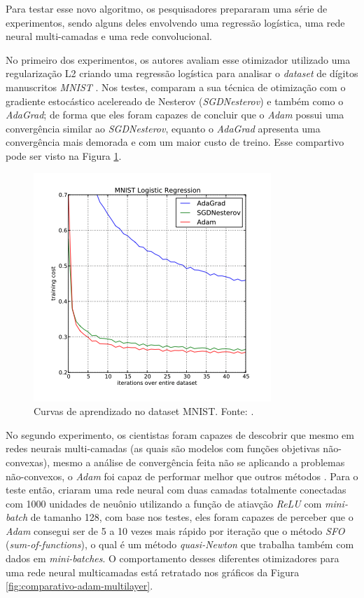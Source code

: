 Para testar esse novo algoritmo, os pesquisadores \textcite{AdamMethod} prepararam uma série de experimentos, sendo alguns deles envolvendo uma regressão logística, uma rede neural multi-camadas e uma rede convolucional.

No primeiro dos experimentos, os autores avaliam esse otimizador utilizado uma regularização L2 criando uma regressão logística para analisar o \textit{dataset} de dígitos manuscritos \textit{MNIST} \parencite{AdamMethod}. Nos testes, \textcite{AdamMethod} comparam a sua técnica de otimização com o gradiente estocástico acelereado de Nesterov (\textit{SGDNesterov}) e também como o \textit{AdaGrad}; de forma que eles foram capazes de concluir que o \textit{Adam} possui uma convergência similar ao \textit{SGDNesterov}, equanto o \textit{AdaGrad} apresenta uma convergência mais demorada e com um maior custo de treino. Esse compartivo pode ser visto na Figura \ref{fig:comparativo-adam-mnist}.

\begin{figure}[h]
    \centering
    \includegraphics[width=0.65\linewidth]{../imagens/retropropagacao-gradiente/comparativo-adam-mnist.png}
    
    \caption[Curvas de aprendizado no dataset MNIST]{%
        Curvas de aprendizado no dataset MNIST.
        \newline
        \small Fonte: \parencite{AdamMethod}.
    }
    \label{fig:comparativo-adam-mnist}
\end{figure}

No segundo experimento, os cientistas foram capazes de descobrir que mesmo em redes neurais multi-camadas (as quais são modelos com funções objetivas não-convexas), mesmo a análise de convergência feita não se aplicando a problemas não-convexos, o \textit{Adam} foi capaz de performar melhor que outros métodos \parencite{AdamMethod}. Para o teste então, \textcite{AdamMethod} criaram uma rede neural com duas camadas totalmente conectadas com 1000 unidades de neuônio utilizando a função de atiavção \textit{ReLU} com \textit{mini-batch} de tamanho 128, com base nos testes, eles foram capazes de perceber que o \textit{Adam} consegui ser de 5 a 10 vezes mais rápido por iteração que o método \textit{SFO} (\textit{sum-of-functions}), o qual é um método \textit{quasi-Newton} que trabalha também com dados em \textit{mini-batches}. O comportamento desses diferentes otimizadores para uma rede neural multicamadas está retratado nos gráficos da Figura \ref{fig:comparativo-adam-multilayer}.

